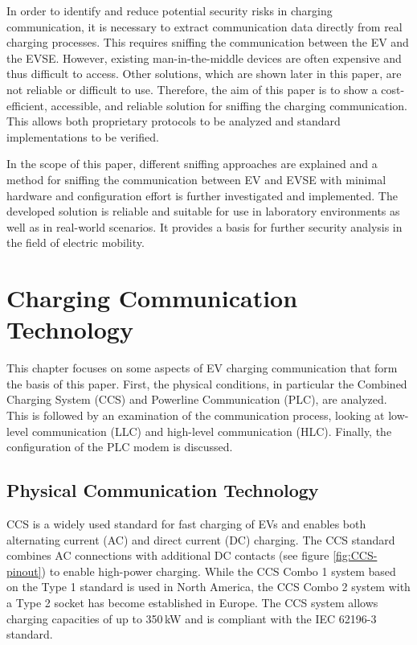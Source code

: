 \documentclass[sigconf]{acmart}
\begin{document}
In order to identify and reduce potential security risks in charging communication, it is necessary to extract communication data directly from real charging processes. This requires sniffing the communication between the EV and the EVSE. However, existing man-in-the-middle devices are often expensive and thus difficult to access. Other solutions, which are shown later in this paper, are not reliable or difficult to use. Therefore, the aim of this paper is to show a cost-efficient, accessible, and reliable solution for sniffing the charging communication. This allows both proprietary protocols to be analyzed and standard implementations to be verified.

In the scope of this paper, different sniffing approaches are explained and a method for sniffing the communication between EV and EVSE with minimal hardware and configuration effort is further investigated and implemented. The developed solution is reliable and suitable for use in laboratory environments as well as in real-world scenarios. It provides a basis for further security analysis in the field of electric mobility.

\section{Charging Communication Technology}
This chapter focuses on some aspects of EV charging communication that form the basis of this paper. First, the physical conditions, in particular the Combined Charging System (CCS) and Powerline Communication (PLC), are analyzed. This is followed by an examination of the communication process, looking at low-level communication (LLC) and high-level communication (HLC). Finally, the configuration of the PLC modem is discussed.

\subsection{Physical Communication Technology}
CCS is a widely used standard for fast charging of EVs and enables both alternating current (AC) and direct current (DC) charging. The CCS standard combines AC connections with additional DC contacts (see figure \ref{fig:CCS-pinout}) to enable high-power charging. While the CCS Combo 1 system based on the Type 1 standard is used in North America, the CCS Combo 2 system with a Type 2 socket has become established in Europe. The CCS system allows charging capacities of up to 350\,kW and is compliant with the IEC 62196-3 standard. \citep[p.\,7]{acharige-review-2023}
\end{document}
